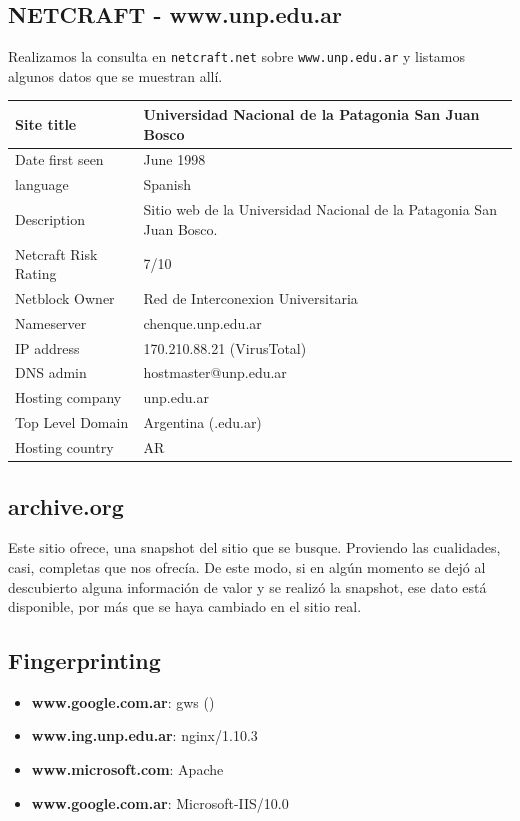 \subsection*{NETCRAFT - www.unp.edu.ar}

Realizamos la consulta en \texttt{netcraft.net} sobre \texttt{www.unp.edu.ar} y listamos algunos datos que se muestran allí.

\begin{tabular}{l | l}
    \hline 
    Site title & Universidad Nacional de la Patagonia San Juan Bosco \\ \hline
    Date first seen & June 1998 \\ \hline
    language & Spanish \\ \hline
    Description & Sitio web de la Universidad Nacional de la Patagonia San Juan Bosco. \\ \hline
    Netcraft Risk Rating & 7/10 \\ \hline
    Netblock Owner & Red de Interconexion Universitaria \\ \hline
    Nameserver & chenque.unp.edu.ar \\ \hline
    IP address & 170.210.88.21 (VirusTotal) \\ \hline
    DNS admin & hostmaster@unp.edu.ar \\ \hline
    Hosting company & unp.edu.ar \\ \hline
    Top Level Domain & Argentina (.edu.ar) \\ \hline
    Hosting country & AR \\ \hline
    
\end{tabular}

\subsection*{archive.org}

Este sitio ofrece, una snapshot del sitio que se busque. Proviendo las cualidades, casi, completas que nos ofrecía. De este modo, si en algún momento se dejó al descubierto alguna información de valor y se realizó la snapshot, ese dato está disponible, por más que se haya cambiado en el sitio real.

\subsection*{Fingerprinting}

\begin{itemize}
    \item \textbf{www.google.com.ar}: gws ()
    \item \textbf{www.ing.unp.edu.ar}: nginx/1.10.3
    \item \textbf{www.microsoft.com}: Apache
    \item \textbf{www.google.com.ar}: Microsoft-IIS/10.0
\end{itemize}

